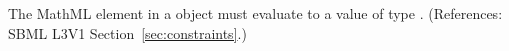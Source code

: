 \removedRule
  {The MathML  element in a \Constraint object must evaluate to a value of type .}
  {(References: SBML L3V1 Section~\ref{sec:constraints}.)}

